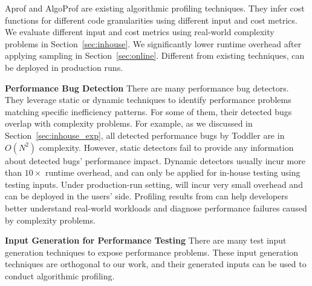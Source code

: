 Aprof\cite{Aprof1, Aprof2} and AlgoProf\cite{AlgoProf} are existing
algorithmic profiling techniques.
They infer cost functions for different code granularities
using different input and cost metrics.
We evaluate different input and cost metrics
using real-world complexity problems in Section~\ref{sec:inhouse}.
We significantly lower runtime overhead after applying sampling in Section~\ref{sec:online}.
Different from existing techniques, \Tool can be deployed in production runs.

\noindent\textbf{Performance Bug Detection}
There are many performance bug detectors.
They leverage static or dynamic techniques to
identify performance problems matching specific inefficiency
patterns\cite{yufei-perf,CLARITY,xiao13:context,PerfBug,Alabama,CARAMEL,XuDataStructure,XuBloatPLDI2009,XuBloatPLDI2010,Cachetor,LoopInvariant,falsesharing}.
For some of them, their detected bugs overlap with complexity problems.
For example, as we discussed in Section~\ref{sec:inhouse_exp},
all detected performance bugs by Toddler are in $O(N^2)$ complexity.
However, static detectors fail to provide any information
about detected bugs' performance impact.
Dynamic detectors usually incur more than $10\times$ runtime overhead,
and can only be applied for in-house testing using testing inputs.
Under production-run setting,
\Tool will incur very small overhead and can be deployed in the users' side.
Profiling results from \Tool can help developers better
understand real-world workloads and diagnose performance failures caused by complexity problems.


\noindent\textbf{Input Generation for Performance Testing}
There are many test input generation techniques to expose performance problems\cite{WISE,EventBreak,slowfuzz}.
These input generation techniques are orthogonal to our work,
and their generated inputs can be used to conduct algorithmic profiling.
